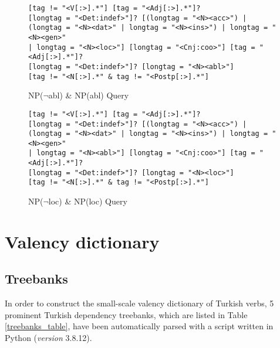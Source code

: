 \begin{figure}[H]
	\begin{lstlisting}
[tag != "<V[:>].*"] [tag = "<Adj[:>].*"]? 
[longtag = "<Det:indef>"]? [(longtag = "<N><acc>") | 
(longtag = "<N><dat>" | longtag = "<N><ins>") | longtag = "<N><gen>" 
| longtag = "<N><loc>"] [longtag = "<Cnj:coo>"] [tag = "<Adj[:>].*"]? 
[longtag = "<Det:indef>"]? [longtag = "<N><abl>"] 
[tag != "<N[:>].*" & tag != "<Postp[:>].*"]
	\end{lstlisting}
	\caption{NP($\neg$abl) \& NP(abl) Query}
	\label{CQl_npabl}
\end{figure}

\begin{figure}[H]
	\begin{lstlisting}
[tag != "<V[:>].*"] [tag = "<Adj[:>].*"]? 
[longtag = "<Det:indef>"]? [(longtag = "<N><acc>") | 
(longtag = "<N><dat>" | longtag = "<N><ins>") | longtag = "<N><gen>" 
| longtag = "<N><abl>"] [longtag = "<Cnj:coo>"] [tag = "<Adj[:>].*"]? 
[longtag = "<Det:indef>"]? [longtag = "<N><loc>"] 
[tag != "<N[:>].*" & tag != "<Postp[:>].*"]
	\end{lstlisting}
	\caption{NP($\neg$loc) \& NP(loc) Query}
	\label{CQl_nploc}
\end{figure}

\section{Valency dictionary} \label{app:valency}
\subsection{Treebanks}

In order to construct the small-scale valency dictionary of Turkish verbs, 5 prominent Turkish dependency treebanks, which are listed in Table \ref{treebanks_table}, have been automatically parsed with a script written in Python (\textit{version} 3.8.12). 

